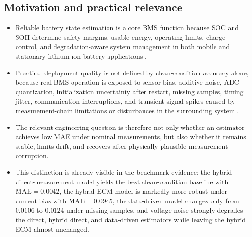 \documentclass[review]{elsarticle}
\begin{document}
\subsection{Motivation and practical relevance}
\begin{itemize}[leftmargin=*]
    \item Reliable battery state estimation is a core BMS function because SOC and SOH determine safety margins, usable energy, operating limits, charge control, and degradation-aware system management in both mobile and stationary lithium-ion battery applications \cite{shrivastavaReviewTechnologicalAdvancement2023,guoSystematicReviewElectrochemical2024,yaoSmarterBatteryManagement2025b}.
    \item Practical deployment quality is not defined by clean-condition accuracy alone, because real BMS operation is exposed to sensor bias, additive noise, ADC quantization, initialization uncertainty after restart, missing samples, timing jitter, communication interruptions, and transient signal spikes caused by measurement-chain limitations or disturbances in the surrounding system \cite{liRobustnessSOCEstimation2015,naseriReliableWirelessBMS2025,bergerBenchmarkingBatteryManagement2024}.
    \item The relevant engineering question is therefore not only whether an estimator achieves low MAE under nominal measurements, but also whether it remains stable, limits drift, and recovers after physically plausible measurement corruption.
    \item This distinction is already visible in the benchmark evidence: the hybrid direct-measurement model yields the best clean-condition baseline with $\mathrm{MAE}=0.0042$, the hybrid ECM model is markedly more robust under current bias with $\mathrm{MAE}=0.0945$, the data-driven model changes only from $0.0106$ to $0.0124$ under missing samples, and voltage noise strongly degrades the direct, hybrid direct, and data-driven estimators while leaving the hybrid ECM almost unchanged.
\end{itemize}
\end{document}
